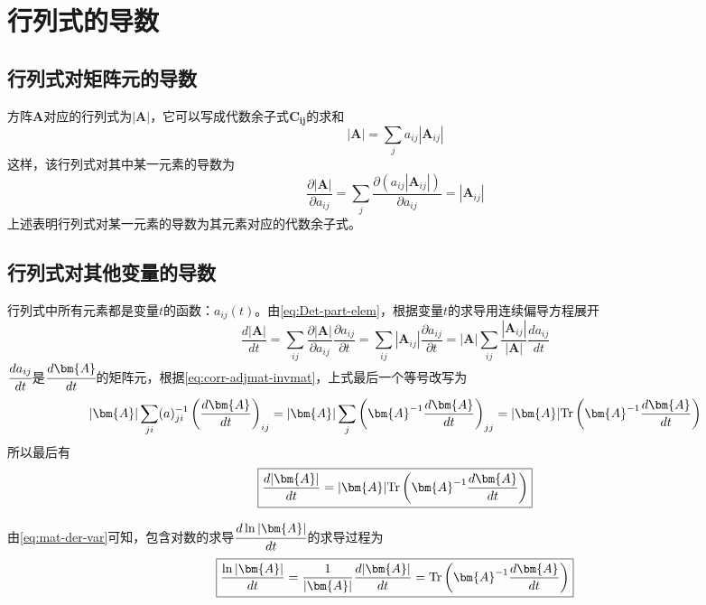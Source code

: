 \section{行列式的导数}

\subsection{行列式对矩阵元的导数}
方阵$\bm{A}$对应的行列式为$|\bm{A}|$，它可以写成代数余子式$\bm{C_{ij}}$的求和
\begin{equation}
    |\bm{A}| = \sum_{j} a_{ij} |\bm{A}_{ij}|
    \label{eq:rep-cofactor}
\end{equation}
这样，该行列式对其中某一元素的导数为
\begin{equation}\boxed{
    \frac{\partial |\bm{A}|}{\partial a_{ij}} = \sum_{j} \frac{\partial \left(a_{ij} |\bm{A}_{ij}|\right)}{\partial a_{ij}} = |\bm{A}_{ij}|
    \label{eq:Det-part-elem}
}\end{equation}
上述表明行列式对某一元素的导数为其元素对应的代数余子式。

\subsection{行列式对其他变量的导数}
行列式中所有元素都是变量$t$的函数：$a_{ij}(t)$。由\cref{eq:Det-part-elem}，根据变量$t$的求导用连续偏导方程展开
\begin{equation*}
    \frac{d |\bm{A}|}{d t} = \sum_{ij} \frac{\partial |\bm{A}|}{\partial a_{ij}} \frac{\partial a_{ij}}{\partial t} = \sum_{ij} |\bm{A}_{ij}| \frac{\partial a_{ij}}{\partial t} = |\bm{A}| \sum_{ij} \frac{|\bm{A}_{ij}|}{|\bm{A}|} \frac{d a_{ij}}{d t}
\end{equation*}
$\cfrac{d a_{ij}}{d t}$是$\cfrac{d \bm{A}}{d t}$的矩阵元，根据\cref{eq:corr-adjmat-invmat}，上式最后一个等号改写为
\begin{equation*}
    |\bm{A}| \sum_{ji} (a)^{-1}_{ji} \left(\frac{d \bm{A}}{d t}\right)_{ij}
    =
    |\bm{A}| \sum_{j} \left( \bm{A}^{-1} \frac{d \bm{A}}{d t} \right)_{jj}
    = 
    |\bm{A}| {\rm Tr} \left( \bm{A}^{-1} \frac{d \bm{A}}{d t} \right)
\end{equation*}
所以最后有
\begin{equation}\boxed{
    \frac{d |\bm{A}|}{d t} = 
    |\bm{A}| {\rm Tr} \left( \bm{A}^{-1} \frac{d \bm{A}}{d t} \right)
    \label{eq:mat-der-var}
}\end{equation}

由\cref{eq:mat-der-var}可知，包含对数的求导$\cfrac{d \ln{|\bm{A}|}}{d t}$的求导过程为
\begin{equation}\boxed{
    \frac{\ln{|\bm{A}|}}{d t} = \frac{1}{|\bm{A}|} \frac{d |\bm{A}|}{d t} = {\rm Tr} \left( \bm{A}^{-1} \frac{d \bm{A}}{d t} \right)
    \label{eq:det-log-dev}
}\end{equation}
